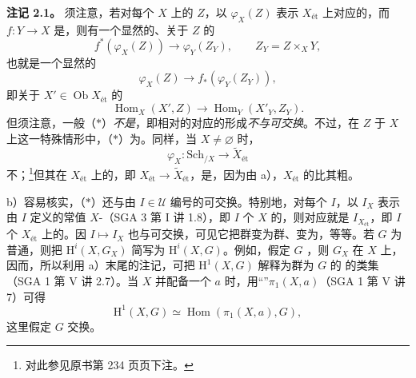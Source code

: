\textbf{注记 2.1。} 须注意，若对每个 $X$ 上的 $Z$，以 $\varphi_X(Z)$ 表示 $X_{\text{ét}}$ 上对应的，而 $f:Y\to X$ 是，则有一个显然的、关于 $Z$ 的
\[
 f^*(\varphi_X(Z))\longrightarrow\varphi_Y(Z_Y),\qquad Z_Y=Z\times_XY,\tag{*}
\]
也就是一个显然的
\[
 \varphi_X(Z)\longrightarrow f_*(\varphi_Y(Z_Y)),
\]
即关于 $X'\in\operatorname{Ob}X_{\text{ét}}$ 的
\[
 \operatorname{Hom}_X(X',Z)\longrightarrow\operatorname{Hom}_Y(X'_Y,Z_Y).
\]
但须注意，一般（$*$）\emph{不是}，即相对的对应的形成\emph{不与可交换}。不过，在 $Z$ 于 $X$ 上这一特殊情形中，（$*$）为。同样，当 $X\ne\varnothing$ 时，
\[
 \varphi_X:\mathrm{Sch}_{/X}\longrightarrow\widetilde X_{\text{ét}}
\]
不；\footnote{对此参见原书第 234 页页下注。}但其在 $X_{\text{ét}}$ 上的，即 $X_{\text{ét}}\to\widetilde X_{\text{ét}}$，是，因为由 a），$X_{\text{ét}}$ 的比其粗。

b）容易核实，（$*$）还与由 $I\in\mathcal U$ 编号的可交换。特别地，对每个 $I$，以 $I_X$ 表示由 $I$ 定义的常值 $X$-（SGA 3 第 I 讲 1.8），即 $I$ 个 $X$ 的，则对应就是 $I_{X_{\text{ét}}}$，即 $I$ 个 $X_{\text{ét}}$ 上的。因 $I\mapsto I_X$ 也与可交换，可见它把群变为群、变为，等等。若 $G$ 为普通，则把 $\mathrm H^i(X,G_X)$ 简写为 $\mathrm H^i(X,G)$。例如，假定 $G$ ，则 $G_X$ 在 $X$ 上，因而，所以利用 a）末尾的注记，可把 $\mathrm H^1(X,G)$ 解释为群为 $G$ 的
的类集（SGA 1 第 V 讲 2.7）。当 $X$ 并配备一个 $a$ 时，用“”$\pi_1(X,a)$（SGA 1 第 V 讲 7）可得
\[
 \mathrm H^1(X,G)\simeq\operatorname{Hom}(\pi_1(X,a),G),\tag{**}
\]
这里假定 $G$ 交换。

